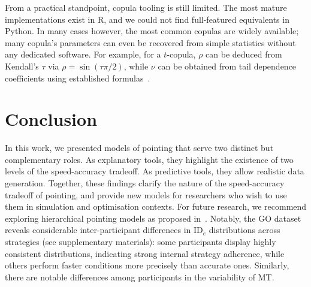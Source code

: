 \documentclass[acmlarge, manuscript,review]{acmart}
\newcommand{\ide}{\ensuremath{{\text{ID}_e}}\xspace}
\begin{document}
From a practical standpoint, copula tooling is still limited. The most mature implementations exist in R, and we could not find full-featured equivalents in Python.  %
In many cases however, the most common copulas are widely available; many copula's parameters can even be recovered from simple statistics without any dedicated software. For example, for a $t$-copula, $\rho$ can be deduced from Kendall's $\tau$ via $\rho = \sin(\tau \pi/2)$, while $\nu$ can be obtained from tail dependence coefficients using established formulas~\cite[Section 3]{demarta2005}. 


\section{Conclusion}
In this work, we presented models of pointing that serve two distinct but complementary roles. As explanatory tools, they highlight the existence of two levels of the speed-accuracy tradeoff. As predictive tools, they allow realistic data generation. 
Together, these findings clarify the nature of the speed-accuracy tradeoff of pointing, and provide new models for researchers who wish to use them in simulation and optimisation contexts.
For future research, we recommend exploring hierarchical pointing models as proposed in~\cite{zhao2022}. Notably, the GO dataset reveals considerable inter-participant differences in \ide distributions across strategies (see supplementary materials): some participants display highly consistent distributions, indicating strong internal strategy adherence, while others perform faster conditions more precisely than accurate ones. Similarly, there are notable differences among participants in the variability of MT.
\end{document}
